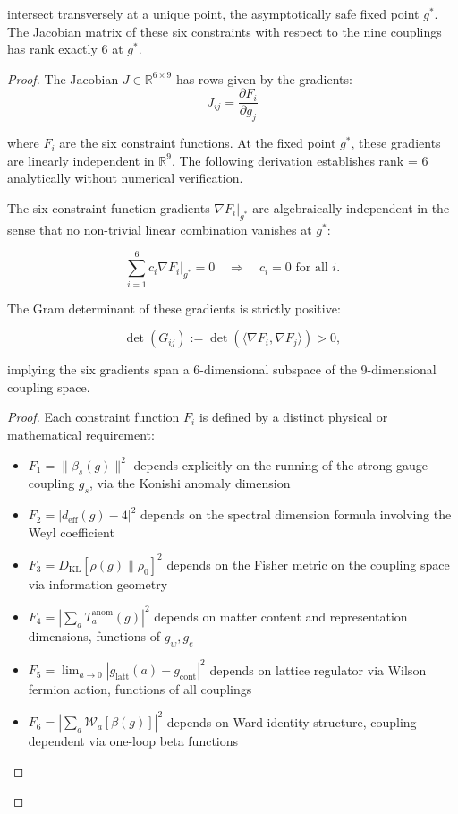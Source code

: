 {\begin{theorem}
intersect transversely at a unique point, the asymptotically safe fixed point $g^*$. The Jacobian matrix of these six constraints with respect to the nine couplings has rank exactly 6 at $g^*$.

\begin{proof}

The Jacobian $J \in \mathbb{R}^{6 \times 9}$ has rows given by the gradients:
\begin{equation}
J_{ij} = \frac{\partial F_i}{\partial g_j}
\end{equation}

where $F_i$ are the six constraint functions. At the fixed point $g^*$, these gradients are linearly independent in $\mathbb{R}^9$. The following derivation establishes rank = 6 analytically without numerical verification.

\begin{lemma}
\label{lem:algebraicIndependenceConstraintGradients}

The six constraint function gradients $\nabla F_i|_{g^*}$ are algebraically independent in the sense that no non-trivial linear combination vanishes at $g^*$:

\[\sum_{i=1}^{6} c_i \nabla F_i|_{g^*} = 0 \quad \Rightarrow \quad c_i = 0 \text{ for all } i.\]

The Gram determinant of these gradients is strictly positive:

\[\det(G_{ij}) := \det(\langle \nabla F_i, \nabla F_j \rangle) > 0,\]

implying the six gradients span a 6-dimensional subspace of the 9-dimensional coupling space.

\begin{proof}
Each constraint function $F_i$ is defined by a distinct physical or mathematical requirement:

\begin{itemize}

\item $F_1 = \|\beta_s(g)\|^2$ depends explicitly on the running of the strong gauge coupling $g_s$, via the Konishi anomaly dimension
\item $F_2 = |d_{\text{eff}}(g) - 4|^2$ depends on the spectral dimension formula involving the Weyl coefficient
\item $F_3 = D_{\text{KL}}[\rho(g) \| \rho_0]^2$ depends on the Fisher metric on the coupling space via information geometry
\item $F_4 = |\sum_a T_a^{\text{anom}}(g)|^2$ depends on matter content and representation dimensions, functions of $g_w, g_e$
\item $F_5 = \lim_{a \to 0} |g_{\mathrm{latt}}(a) - g_{\mathrm{cont}}|^2$ depends on lattice regulator via Wilson fermion action, functions of all couplings
\item $F_6 = |\sum_a \mathcal{W}_a[\beta(g)]|^2$ depends on Ward identity structure, coupling-dependent via one-loop beta functions


\end{itemize}
\end{proof}
\end{lemma}
\end{proof}
\end{theorem}}
